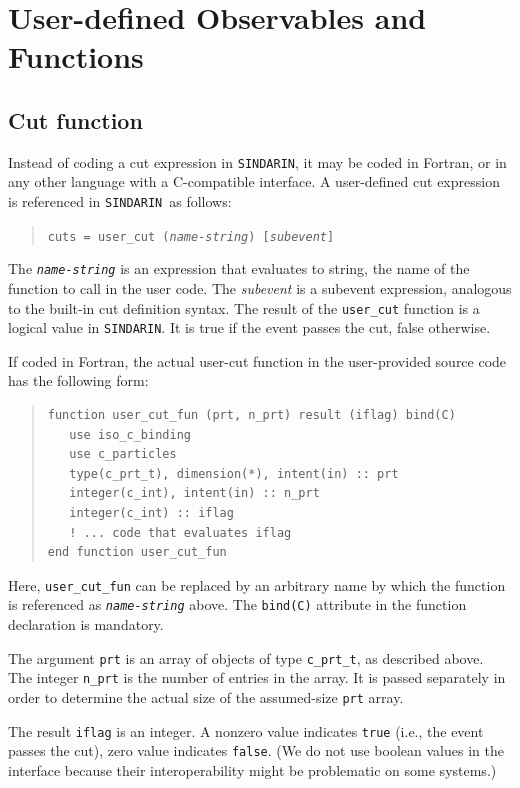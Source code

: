 \documentclass[12pt]{book}
\newcommand{\ttt}[1]{\texttt{#1}}
\newcommand{\sindarin}{\texttt{SINDARIN}}
\begin{document}
\section{User-defined Observables and Functions}
\subsection{Cut function}
Instead of coding a cut expression in \sindarin, it may be coded in
Fortran, or in any other language with a C-compatible interface.  A
user-defined cut expression is referenced in \sindarin\ as follows:
\begin{quote}
\begin{footnotesize}
  \ttt{cuts = user\_cut (\emph{name-string}) [\emph{subevent}]}
\end{footnotesize}
\end{quote}
The \ttt{\emph{name-string}} is an expression that evaluates to
string, the name of the function to call in the user code.  The
\emph{subevent} is a subevent expression, analogous to the built-in
cut definition syntax.  The result of the \ttt{user\_cut} function is
a logical value in \sindarin.  It is true if the event passes the cut,
false otherwise.

If coded in Fortran, the actual user-cut function in the user-provided
source code has the following form:
\begin{quote}
\begin{footnotesize}
\begin{verbatim}
function user_cut_fun (prt, n_prt) result (iflag) bind(C)
   use iso_c_binding
   use c_particles
   type(c_prt_t), dimension(*), intent(in) :: prt
   integer(c_int), intent(in) :: n_prt
   integer(c_int) :: iflag
   ! ... code that evaluates iflag
end function user_cut_fun
\end{verbatim}
\end{footnotesize}
\end{quote}
Here, \ttt{user\_cut\_fun} can be replaced by an arbitrary name by
which the function is referenced as \ttt{\emph{name-string}} above.
The \ttt{bind(C)} attribute in the function declaration is mandatory.

The argument \ttt{prt} is an array of objects of type \ttt{c\_prt\_t},
as described above.  The integer \ttt{n\_prt} is the number of entries
in the array.  It is passed separately in order to determine the
actual size of the assumed-size \ttt{prt} array.

The result \ttt{iflag} is an integer.  A nonzero value indicates
\ttt{true} (i.e., the event passes the cut), zero value indicates
\ttt{false}.  (We do not use boolean values in the interface because
their interoperability might be problematic on some systems.)
\end{document}
